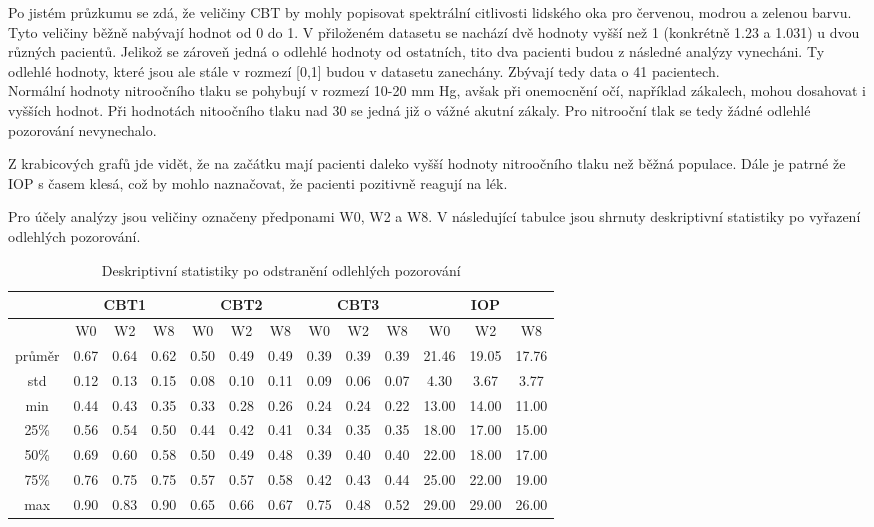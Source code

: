 \documentclass{article}
\begin{document}
Po jistém průzkumu se zdá, že veličiny CBT by mohly popisovat spektrální citlivosti lidského oka pro červenou, modrou a zelenou barvu.
Tyto veličiny běžně nabývají hodnot od 0 do 1.
V přiloženém datasetu se nachází dvě hodnoty vyšší než 1 (konkrétně 1.23 a 1.031) u dvou různých pacientů.
Jelikož se zároveň jedná o odlehlé hodnoty od ostatních, tito dva pacienti budou z následné analýzy vynecháni.
Ty odlehlé hodnoty, které jsou ale stále v rozmezí [0,1] budou v datasetu zanechány.
Zbývají tedy data o 41 pacientech.\\

Normální hodnoty nitroočního tlaku se pohybují v rozmezí 10-20 mm Hg, avšak při onemocnění očí, například zákalech, mohou dosahovat i vyšších hodnot.
Při hodnotách nitoočního tlaku nad 30 se jedná již o vážné akutní zákaly.
Pro nitrooční tlak se tedy žádné odlehlé pozorování nevynechalo.

Z krabicových grafů jde vidět, že na začátku mají pacienti daleko vyšší hodnoty nitroočního tlaku než běžná populace.
Dále je patrné že IOP s časem klesá, což by mohlo naznačovat, že pacienti pozitivně reagují na lék.

Pro účely analýzy jsou veličiny označeny předponami W0, W2 a W8.
V následující tabulce jsou shrnuty deskriptivní statistiky po vyřazení odlehlých pozorování.

\begin{table}[ht]
  \centering
  \caption{Deskriptivní statistiky po odstranění odlehlých pozorování}
  \begin{tabular}{|cccc|ccc|ccc|ccc|}
    \hline
    & \multicolumn{3}{|c|}{CBT1} & \multicolumn{3}{c|}{CBT2} & \multicolumn{3}{c|}{CBT3} & \multicolumn{3}{c|}{IOP}\\
    \hline
    & W0 & W2 & W8 & W0 & W2 & W8 & W0 & W2 & W8 & W0 & W2 & W8 \\
    \hline
    průměr  & 0.67 & 0.64 & 0.62 & 0.50 & 0.49 & 0.49 & 0.39 & 0.39 & 0.39 & 21.46 & 19.05 & 17.76 \\
    std     & 0.12 & 0.13 & 0.15 & 0.08 & 0.10 & 0.11 & 0.09 & 0.06 & 0.07 & 4.30 & 3.67 & 3.77\\
    min     & 0.44 & 0.43 & 0.35 & 0.33 & 0.28 & 0.26 & 0.24 & 0.24 & 0.22 & 13.00 & 14.00 & 11.00 \\
    25\%    & 0.56 & 0.54 & 0.50 & 0.44 & 0.42 & 0.41 & 0.34 & 0.35 & 0.35 & 18.00 & 17.00 & 15.00 \\
    50\%    & 0.69 & 0.60 & 0.58 & 0.50 & 0.49 & 0.48 & 0.39 & 0.40 & 0.40 & 22.00 & 18.00 & 17.00 \\
    75\%    & 0.76 & 0.75 & 0.75 & 0.57 & 0.57 & 0.58 & 0.42 & 0.43 & 0.44 & 25.00 & 22.00 & 19.00 \\
    max     & 0.90 & 0.83 & 0.90 & 0.65 & 0.66 & 0.67 & 0.75 & 0.48 & 0.52 & 29.00 & 29.00 & 26.00 \\
    \hline
  \end{tabular}
\end{table}
\end{document}
